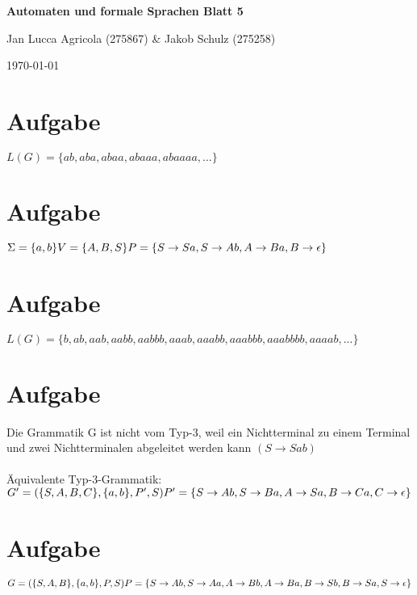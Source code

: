 \documentclass[a4paper,12pt,titlepage]{article}
\begin{document}
\begin{titlepage}
    \centering
    \vspace*{2cm}
    {\LARGE\bfseries Automaten und formale Sprachen Blatt 5\par}
    \vspace{2cm}
    {\Large Jan Lucca Agricola (275867) \& Jakob Schulz (275258)\par}
    \vspace{2cm}
    {\large\today\par}
\end{titlepage}

\section{Aufgabe}
$L(G) = \{ab, aba, abaa, abaaa, abaaaa,...\}$
\section{Aufgabe}
$\Sigma = \{a,b\}\\
V = \{A,B, S\}\\
P = \{S \rightarrow Sa, S \rightarrow Ab, A \rightarrow Ba, B \rightarrow \epsilon\}$
\section{Aufgabe}
$L(G) = \{b, ab, aab, aabb, aabbb, aaab, aaabb, aaabbb, aaabbbb, aaaab,...\}$
\section{Aufgabe}
Die Grammatik G ist nicht vom Typ-3, weil ein Nichtterminal zu einem Terminal und zwei Nichtterminalen abgeleitet werden kann $(S \rightarrow Sab)$\\
\\
Äquivalente Typ-3-Grammatik:\\
$G' = (\{S, A, B, C\}, \{a, b\}, P', S)\\
P' = \{S \rightarrow Ab, S \rightarrow Ba, A \rightarrow Sa, B \rightarrow Ca, C \rightarrow \epsilon\}
$
\section{Aufgabe}
$G = (\{S, A, B\}, \{a, b\}, P, S)\\
P = \{\\S \rightarrow Ab,\\ S \rightarrow Aa,\\ A \rightarrow Bb,\\ A \rightarrow Ba,\\ B \rightarrow Sb,\\ B \rightarrow Sa,\\ S \rightarrow \epsilon\\\}
$
\end{document}

